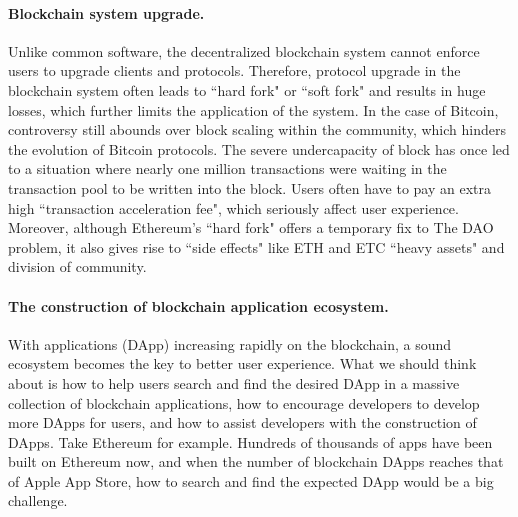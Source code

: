 \paragraph{Blockchain system upgrade.} Unlike common software, the decentralized blockchain system cannot enforce users to upgrade clients and protocols. Therefore, protocol upgrade in the blockchain system often leads to 	``hard fork" or ``soft fork" and results in huge losses, which further limits the application of the system. In the case of Bitcoin, controversy still abounds over block scaling within the community, which hinders the evolution of Bitcoin protocols. The severe undercapacity of block has once led to a situation where nearly one million transactions were waiting in the transaction pool to be written into the block. Users often have to pay an extra high ``transaction acceleration fee", which seriously affect user experience. Moreover, although Ethereum's ``hard fork" offers a temporary fix to The DAO problem, it also gives rise to ``side effects" like ETH and ETC ``heavy assets" and division of community.

\paragraph{The construction of blockchain application ecosystem.} With applications (DApp) increasing rapidly on the blockchain, a sound ecosystem becomes the key to better user experience. What we should think about is how to help users search and find the desired DApp in a massive collection of blockchain applications, how to encourage developers to develop more DApps for users, and how to assist developers with the construction of DApps. Take Ethereum for example. Hundreds of thousands of apps have been built on Ethereum now, and when the number of blockchain DApps reaches that of Apple App Store, how to search and find the expected DApp would be a big challenge.


